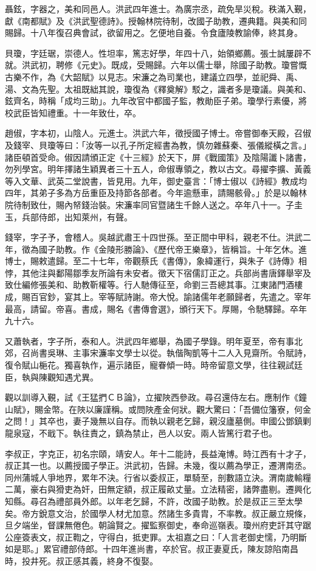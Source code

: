 \begin{pinyinscope}
聶鉉，字器之，美和同邑人。洪武四年進士。為廣宗丞，疏免旱災稅。秩滿入覲，獻《南都賦》及《洪武聖德詩》。授翰林院待制，改國子助教，遷典籍。與美和同賜歸。十八年復召典會試，欲留用之。乞便地自養。令食廬陵教諭俸，終其身。

貝瓊，字廷琚，崇德人。性坦率，篤志好學，年四十八，始領鄉薦。張士誠屢辟不就。洪武初，聘修《元史》。既成，受賜歸。六年以儒士舉，除國子助教。瓊嘗慨古樂不作，為《大韶賦》以見志。宋濂之為司業也，建議立四學，並祀舜、禹、湯、文為先聖。太祖既絀其說，瓊復為《釋奠解》駁之，識者多是瓊議。與美和、鉉齊名，時稱「成均三助」。九年改官中都國子監，教勛臣子弟。瓊學行素優，將校武臣皆知禮重。十一年致仕，卒。

趙俶，字本初，山陰人。元進士。洪武六年，徵授國子博士。帝嘗御奉天殿，召俶及錢宰、貝瓊等曰：「汝等一以孔子所定經書為教，慎勿雜蘇秦、張儀縱橫之言。」諸臣頓首受命。俶因請頒正定《十三經》於天下，屏《戰國策》及陰陽讖卜諸書，勿列學宮。明年擇諸生穎異者三十五人，命俶專領之，教以古文。尋擢李擴、黃義等入文華、武英二堂說書，皆見用。九年，御史臺言：「博士俶以《詩經》教成均四年，其弟子多為方岳重臣及持節各部者。今年逾懸車，請賜骸骨。」於是以翰林院待制致仕，賜內帑錢治裝。宋濂率同官暨諸生千餘人送之。卒年八十一。子圭玉，兵部侍郎，出知萊州，有聲。

錢宰，字子予，會稽人。吳越武肅王十四世孫。至正間中甲科，親老不仕。洪武二年，徵為國子助教。作《金陵形勝論》、《歷代帝王樂章》，皆稱旨。十年乞休。進博士，賜敕遣歸。至二十七年，帝觀蔡氏《書傳》，象緯運行，與朱子《詩傳》相悖，其他注與鄱陽鄒季友所論有未安者。徵天下宿儒訂正之。兵部尚書唐鐸舉宰及致仕編修張美和、助教靳權等。行人馳傳征至，命劉三吾總其事。江東諸門酒樓成，賜百官鈔，宴其上。宰等賦詩謝。帝大悅。諭諸儒年老願歸者，先遣之。宰年最高，請留。帝喜。書成，賜名《書傳會選》，頒行天下。厚賜，令馳驛歸。卒年九十六。

又蕭執者，字子所，泰和人。洪武四年鄉舉，為國子學錄。明年夏至，帝有事北郊，召尚書吳琳、主事宋濂率文學士以從。執偕陶凱等十二人入見齋所。令賦詩，復令賦山梔花。獨喜執作，遍示諸臣，寵眷傾一時。時帝留意文學，往往親試廷臣，執與陳觀知遇尤異。

觀以訓導入覲，試《王猛捫ＣＢ論》，立擢陜西參政。尋召還侍左右。應制作《鐘山賦》，賜金幣。在陜以廉謹稱。或問陜產金何狀。觀大驚曰：「吾備位籓寮，何金之問！」其卒也，妻子幾無以自存。而執以親老乞歸，親沒廬墓側。申國公鄧鎮剿龍泉寇，不戢下。執往責之，鎮為禁止，邑人以安。兩人皆篤行君子也。

李叔正，字克正，初名宗頤，靖安人。年十二能詩，長益淹博。時江西有十才子，叔正其一也。以薦授國子學正。洪武初，告歸。未幾，復以薦為學正，遷渭南丞。同州蒲城人爭地界，累年不決。行省以委叔正，單騎至，剖數語立決。渭南歲輸糧二萬，豪右與猾吏為奸，田無定額，叔正履畝丈量。立法精密，諸弊盡剔。遷興化知縣。尋召為禮部員外郎。以年老乞歸，不許，改國子助教。於是叔正三至太學矣。帝方銳意文治，於國學人材尤加意。然諸生多貴胄，不率教。叔正嚴立規條，旦夕端坐，督課無倦色。朝論賢之。擢監察御史，奉命巡嶺表。瓊州府吏訐其守踞公座簽表文，叔正鞫之，守得白，抵吏罪。太祖嘉之曰：「人言老御史懦，乃明斷如是耶。」累官禮部侍郎。十四年進尚書，卒於官。叔正妻夏氏，陳友諒陷南昌時，投井死。叔正感其義，終身不復娶。


\end{pinyinscope}
